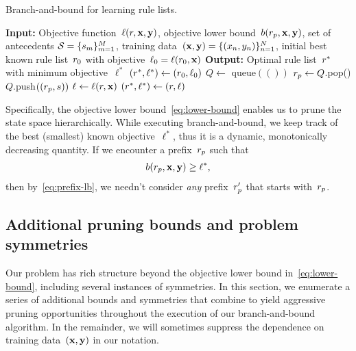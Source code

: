 \begin{algorithm}[t!]
\caption{Branch-and-bound for learning rule lists.}
\label{alg:branch-and-bound}
\begin{algorithmic}
\normalsize
\State \textbf{Input:} Objective function~$\ell({r}, \mathbf{x}, \mathbf{y})$,
objective lower bound~${b({r_p}, \mathbf{x}, \mathbf{y})}$,
set of antecedents ${{\mathcal S} = \{s_m\}_{m=1}^M}$,
training data~$(\mathbf{x}, \mathbf{y}) = {\{(x_n, y_n)\}_{n=1}^N}$,
initial best known rule list~${r}_0$ with objective~${\ell_0 = \ell({r}_0, \mathbf{x})}$
\State \textbf{Output:} Optimal rule list~${r}^*$ with minimum objective~$\ell^*$
\State $({r}^*, \ell^*) \gets ({r}_0, \ell_0)$ 
\State $Q \gets $ queue$(())$ 
 
	\State ${r_p} \gets Q$.pop() 
	 
         
            \State $Q$.push$(({r_p}, s))$ 
        \EndFor
        \State $\ell \gets \ell({r}, \mathbf{x})$ 
        \If {$\ell < \ell^*$}
            \State $({r}^*, \ell^*) \gets ({r}, \ell)$ 
        \EndIf
    \EndIf
\EndWhile
\end{algorithmic}
\end{algorithm}

Specifically, the objective lower bound~\eqref{eq:lower-bound} enables us to prune
the state space hierarchically.
%
While executing branch-and-bound, we keep track of the best (smallest) known
objective~$\ell^*$, thus it is a dynamic, monotonically decreasing quantity.
%
If we encounter a prefix~${r_p}$ such that
\begin{align}
b(\Prefix, \x, \y) \ge \ell^*,
\end{align}
then by~\eqref{eq:prefix-lb}, we needn't consider \emph{any} prefix~${r'_p}$
that starts with~${r_p}$.

\subsection{Additional pruning bounds and problem symmetries}

Our problem has rich structure beyond the objective lower bound in~\eqref{eq:lower-bound},
including several instances of symmetries.
%
In this section, we enumerate a series of additional bounds and symmetries that
combine to yield aggressive pruning opportunities throughout the execution of
our branch-and-bound algorithm.
%
In the remainder, we will sometimes suppress the dependence on
training data~$(\mathbf{x}, \mathbf{y})$ in our notation.

